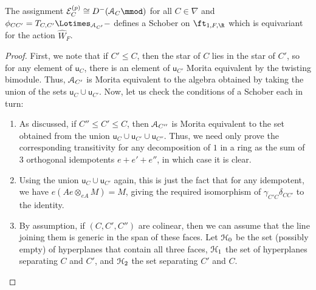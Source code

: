  \begin{theorem}\label{thm:p-Schober}
   The assignment $\mathcal{E}_C^{(p)}\cong D^-(\EuScript{A}_{C}\mmod)$ for all $C\in \nabla$ and $\phi_{CC'}=T_{C,{C'}}\Lotimes_{\EuScript{A}_{C'}}-$ defines a Schober on $\ft_{1,F,\R}$ which is equivariant for the action $\widehat{W}_F$.  
 \end{theorem}
 \begin{proof}   
   First, we note that if $C'\leq C$, then the star of $C$ lies in the star of $C'$, so for any element of $\mathsf{u}_C$, there is an element of $\mathsf{u}_{C'}$ Morita equivalent by the twisting bimodule.  Thus, $\EuScript{A}_{C'}$ is Morita equivalent to the algebra obtained by taking the union of the sets $\mathsf{u}_C\cup \mathsf{u}_{C'}$.  Now, let us check the conditions of a Schober each in turn:
   \begin{enumerate}[wide]
   \item As discussed, if $C'' \leq C'\leq C$, then $\EuScript{A}_{C''}$ is Morita equivalent to the set obtained from the union $
     \mathsf{u}_C\cup \mathsf{u}_{C'}\cup \mathsf{u}_{C''}$.  Thus, we need only prove the corresponding transitivity for any decomposition of $1$ in a ring as the sum of 3 orthogonal idempotents $e+e'+e''$, in which case it is clear.
 \item Using the union $\mathsf{u}_C\cup \mathsf{u}_{C'}$ again, this is just the fact that for any idempotent, we have $e(Ae\otimes_{eA}M)=M$, giving the required  isomorphism of  $\gamma_{C'C}\delta_{CC'}$ to the identity.
\item By assumption, if $(C,C',C'')$ are colinear, then we can assume that the line joining them is generic in  the span of these faces.   Let $\EuScript{H}_0$ be the set (possibly empty) of hyperplanes that contain all three faces, $\EuScript{H}_1$ the set of hyperplanes separating $C$ and ${C'}$, and $\EuScript{H}_2$ the set separating ${C'}$ and $C$.


\end{enumerate}
\end{proof}
